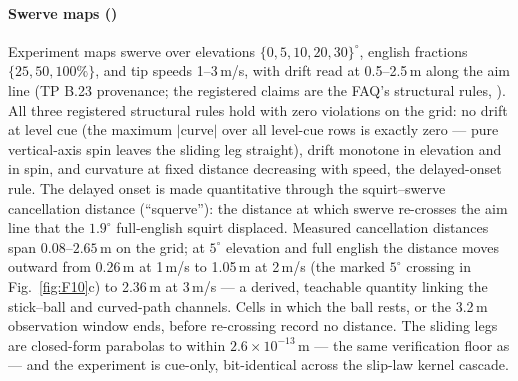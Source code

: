\paragraph{Swerve maps ()}
Experiment  maps swerve over elevations
$\{0, 5, 10, 20, 30\}^\circ$, english fractions $\{25, 50, 100\%\}$, and
tip speeds 1--3\,m/s, with drift read at 0.5--2.5\,m along the aim line
(TP B.23 provenance; the registered claims are the FAQ's structural rules,
\citealp{alciatore_tp_catalog, alciatore_faq}). All three registered
structural rules hold with zero violations on the grid: no drift at level
cue (the maximum $|$curve$|$ over all level-cue rows is exactly zero ---
pure vertical-axis spin leaves the sliding leg straight), drift monotone
in elevation and in spin, and curvature at fixed distance decreasing with
speed, the delayed-onset rule. The delayed onset is made quantitative
through the squirt--swerve cancellation distance (``squerve''): the
distance at which swerve re-crosses the aim line that the $1.9^\circ$
full-english squirt displaced. Measured cancellation distances span
$0.08$--$2.65$\,m on the grid; at $5^\circ$ elevation and full english the
distance moves outward from 0.26\,m at 1\,m/s to 1.05\,m at 2\,m/s (the
marked $5^\circ$ crossing in Fig.~\ref{fig:F10}c) to
2.36\,m at 3\,m/s --- a derived, teachable quantity
linking the stick--ball and curved-path channels. Cells in which the ball
rests, or the 3.2\,m observation window ends, before re-crossing record no
distance. The sliding legs are closed-form parabolas to within
$2.6\times10^{-13}$\,m --- the same verification floor as  ---
and the experiment is cue-only, bit-identical across the slip-law kernel
cascade.
